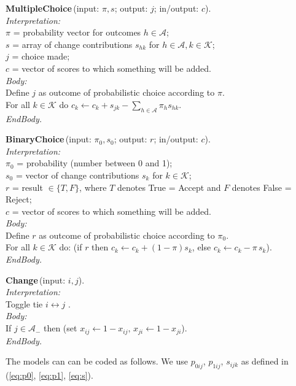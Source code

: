 \documentclass[a4paper,12pt,fleqn]{article}
\begin{document}
\noindent
\textbf{MultipleChoice}\,(\textsf{input:} $\pi, s$; \textsf{output:} $j$;  \textsf{in/output:} $c$).\\
\textit{Interpretation:}\\
$\pi$ = probability vector for outcomes $h \in \mathcal A$;\\
$s$ = array of change contributions $s_{hk}$ for $h \in \mathcal A, k \in \mathcal K$;\\
$j$ = choice made;\\
$c$ = vector of scores to which something will be added.\\
\textit{Body:}\\
Define $j$ as outcome of probabilistic choice according to $\pi$.\\
For all $k \in \mathcal K$ do $c_k  \leftarrow c_k + s_{jk} - \sum_{h \in \mathcal A} \pi_h s_{hk}$.\\
\textit{EndBody.}
\medskip

\noindent
\textbf{BinaryChoice}\,(\textsf{input:} $\pi_0, s_0$; \textsf{output:} $r$;  \textsf{in/output:}  $c$).\\
\textit{Interpretation:}\\
$\pi_0$ = probability (number between 0 and 1);\\
$s_0$ = vector of change contributions $s_{k}$ for $ k \in \mathcal K$;\\
$r$ = result $\in \{T, F\}$, where $T$ denotes True = Accept and $F$ denotes False = Reject;\\
$c$ = vector of scores to which something will be added.\\
\textit{Body:}\\
Define $r$ as outcome of probabilistic choice according to $\pi_0$.\\
For all $k \in \mathcal K$ do: \big(if $r$ then $c_k \leftarrow c_k + (1-\pi) s_{k}$,
else $c_k  \leftarrow c_k -\pi\,s_k $\big).\\
\textit{EndBody.}
\medskip

\noindent
\textbf{Change}\,(\textsf{input:} $ i,j$).\\
\textit{Interpretation:}\\
Toggle tie $i \leftrightarrow j$ .\\
\textit{Body:}\\
If $j \in \mathcal A_-$ then \big(set $x_{ij} \leftarrow 1-x_{ij},\, x_{ji} \leftarrow 1-x_{ji}$\big).\\
\textit{EndBody.}
\medskip

\noindent
The models can can be coded as follows.
We use $p_{0ij}$, $p_{1ij}$, $s_{ijk}$ as defined in (\ref{eq:p0}, \ref{eq:p1}, \ref{eq:s}).
\end{document}
